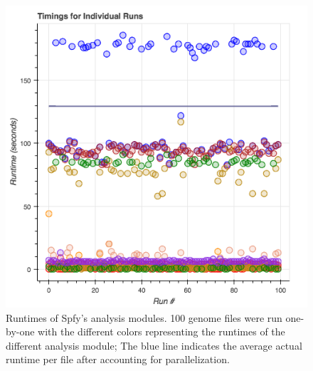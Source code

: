 \documentclass{article}
\begin{document}
\begin{figure}[!hb]
\begin{center}
\includegraphics[width=\textwidth]{images/spfy_indivs.png}
\end{center}
\caption{Runtimes of Spfy's analysis modules. 100 genome files were run one-by-one with the different colors representing the runtimes of the different analysis module; The blue line indicates the average actual runtime per file after accounting for parallelization.}\label{fig:spfy_performance_indivs}
\end{figure}
\end{document}

